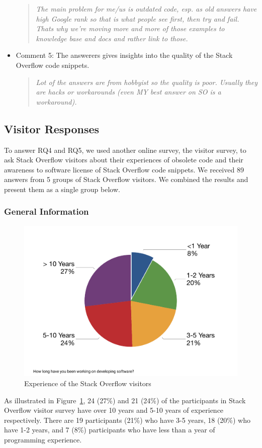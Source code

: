 \documentclass{svjour3}                     %
\begin{document}
\begin{itemize}[label={}]
	\begin{quote}\textit{The main problem for me/us is outdated code, esp. as old
			answers have high Google rank so that is what people see first, then try and
			fail. Thats why we're moving more and more of those examples to knowledge base
			and docs and rather link to those.}\end{quote}
	
	\item Comment 5: The answerers gives insights into the quality of the Stack
	Overflow code snippets.
	
	\begin{quote}\textit{Lot of the answers are from hobbyist so the quality is
			poor. Usually they are hacks or workarounds (even MY best answer on SO is a
			workaround).}\end{quote} \end{itemize}

\subsection{Visitor Responses}

To answer RQ4 and RQ5, we used another online survey, the visitor survey, to ask
Stack Overflow visitors about their experiences of obsolete code and their
awareness to software license of Stack Overflow code snippets. We received 89
answers from 5 groups of Stack Overflow visitors. We combined the results and
present them as a single group below.

\subsubsection*{General Information}

\begin{figure}
		\centering
		\includegraphics[width=0.4\linewidth]{survey_visitor_exp}
		\caption{Experience of the Stack Overflow visitors}
		\label{fig:survey_visitor_exp}
\end{figure}

As illustrated in Figure~\ref{fig:survey_visitor_exp}, 24 (27\%) and 21 (24\%)
of the participants in Stack Overflow visitor survey have over 10 years and 5-10
years of experience respectively. There are 19 participants (21\%) who have 3-5
years, 18 (20\%) who have 1-2 years, and 7 (8\%) participants who have less than a
year of programming experience.
\end{document}
